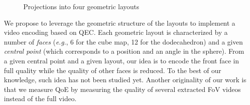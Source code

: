 \begin{figure}[t]
\centering
{}
\caption{Projections into four geometric layouts}\label{fig:mapping}
\end{figure}

We propose to leverage the geometric
structure of the layouts to implement a video encoding based on
\ac{QEC}. Each geometric layout is characterized by a number of
\emph{faces} (\textit{e.g.}, 6 for the cube map, 12 for the
dodecahedron) and a given \emph{central point} (which corresponds to a
position and an angle in the sphere).
From a given central point and a given layout, our idea is to encode
the front face in full quality while the quality of other faces is
reduced.
To the best of our knowledge, such idea has not been studied yet.
Another originality of our work is that we measure \ac{QoE} by
measuring the quality of several extracted \ac{FoV} videos instead of
the full video.

